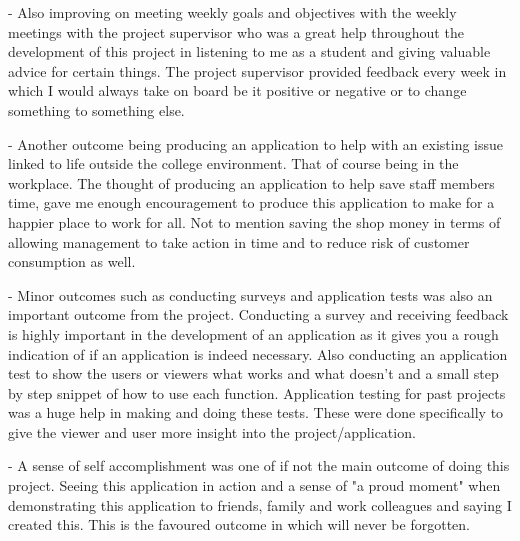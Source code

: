 - Also improving on meeting weekly goals and objectives with the weekly meetings with the project supervisor who was a great help throughout the development of this project in listening to me as a student and giving valuable advice for certain things. The project supervisor provided feedback every week in which I would always take on board be it positive or negative or to change something to something else.
\newline

- Another outcome being producing an application to help with an existing issue linked to life outside the college environment. That of course being in the workplace. The thought of producing an application to help save staff members time, gave me enough encouragement to produce this application to make for a happier place to work for all. Not to mention saving the shop money in terms of allowing management to take action in time and to reduce risk of customer consumption as well.
\newline

- Minor outcomes such as conducting surveys and application tests was also an important outcome from the project. Conducting a survey and receiving feedback is highly important in the development of an application as it gives you a rough indication of if an application is indeed necessary. Also conducting an application test to show the users or viewers what works and what doesn't and a small step by step snippet of how to use each function. Application testing for past projects was a huge help in making and doing these tests. These were done specifically to give the viewer and user more insight into the project/application.

- A sense of self accomplishment was one of if not the main outcome of doing this project. Seeing this application in action and a sense of "a proud moment" when demonstrating this application to friends, family and work colleagues and saying I created this. This is the favoured outcome in which will never be forgotten.
\newline
